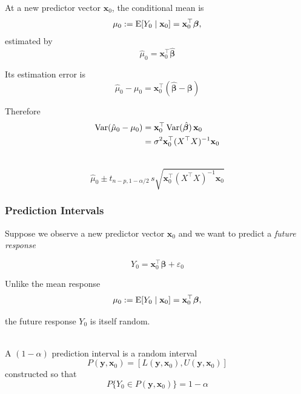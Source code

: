 At a new predictor vector $\mathbf{x}_0$, the conditional mean is
\begin{equation*}
    \mu_0 := \operatorname{E}[Y_0 \mid \mathbf{x}_0] = \mathbf{x}_0^\top \bm\beta,
\end{equation*}
estimated by
\begin{equation*}
    \hat\mu_0 = \mathbf{x}_0^\top \hat{\bm\beta}
\end{equation*}

Its estimation error is
\begin{equation*}
    \hat\mu_0 - \mu_0 = \mathbf{x}_0^\top(\hat{\bm\beta}-\bm\beta)
\end{equation*}

Therefore
\begin{align*}
    \operatorname{Var}(\hat\mu_0 - \mu_0) &= \mathbf{x}_0^\top \operatorname{Var}(\hat{\bm\beta})\, \mathbf{x}_0 \\
    &= \sigma^2 \mathbf{x}_0^\top (X^\top X)^{-1} \mathbf{x}_0
\end{align*}

\begin{result} \leavevmode\\
    \begin{equation*}
        \hat\mu_0 \pm t_{n-p,1-\alpha/2}\, s\sqrt{\mathbf{x}_0^\top (X^\top X)^{-1} \mathbf{x}_0}
    \end{equation*}
\end{result}

\subsubsection{Prediction Intervals}

Suppose we observe a new predictor vector $\mathbf{x}_0$ and we want to predict a \textit{future response}

\begin{equation*}
    Y_0=\mathbf{x}_0^\top \bm\beta+\varepsilon_0
\end{equation*}

Unlike the mean response
\begin{equation*}
    \mu_0 := \operatorname{E}[Y_0 \mid \mathbf{x}_0] = \mathbf{x}_0^\top \bm\beta,
\end{equation*}

the future response $Y_0$ is itself random.

\begin{definition}\leavevmode\\
    A $(1-\alpha)$ prediction interval is a random interval
    \begin{equation*}
        P(\mathbf{y}, \mathbf{x}_0)=[L(\mathbf{y}, \mathbf{x}_0),U(\mathbf{y}, \mathbf{x}_0)]
    \end{equation*}
    constructed so that
    \begin{equation*}
        P\{Y_0 \in P(\mathbf{y}, \mathbf{x}_0)\}=1-\alpha
    \end{equation*}
\end{definition}

